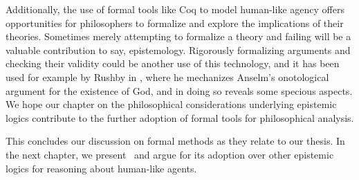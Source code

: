 Additionally, the use of formal tools like Coq to model human-like agency offers opportunities for philosophers to formalize and explore the implications of their theories. Sometimes merely attempting to formalize a theory and failing will be a valuable contribution to say, epistemology. Rigorously formalizing arguments and checking their validity could be another use of this technology, and it has been used for example by Rushby in \cite{rushby_ontological}, where he mechanizes Anselm's onotological argument for the existence of God, and in doing so reveals some specious aspects. We hope our chapter on the philosophical considerations underlying epistemic logics contribute to the further adoption of formal tools for philosophical analysis.

This concludes our discussion on formal methods as they relate to our thesis. In the next chapter, we present \DASL\ and argue for its adoption over other epistemic logics for reasoning about human-like agents.


%
%

